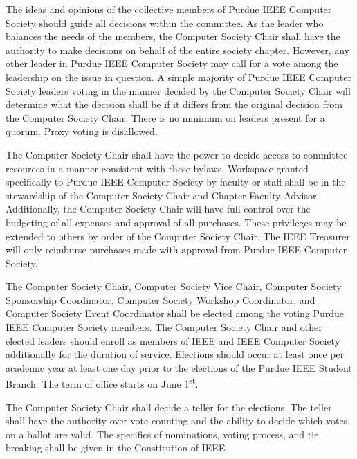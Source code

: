 \documentclass[12pt]{constitution}
\newcommand{\datetermstart}{June 1\textsuperscript{st}} %
\begin{document}
\label{art:decide}

The ideas and opinions of the collective members of Purdue IEEE Computer Society should guide all decisions within the committee. As the leader who balances the needs of the members, the Computer Society Chair shall have the authority to make decisions on behalf of the entire society chapter. However, any other leader in Purdue IEEE Computer Society may call for a vote among the leadership on the issue in question. A simple majority of Purdue IEEE Computer Society leaders voting in the manner decided by the Computer Society Chair will determine what the decision shall be if it differs from the original decision from the Computer Society Chair. There is no minimum on leaders present for a quorum. Proxy voting is disallowed.

The Computer Society Chair shall have the power to decide access to committee resources in a manner consistent with these bylaws. Workspace granted specifically to Purdue IEEE Computer Society by faculty or staff shall be in the stewardship of the Computer Society Chair and Chapter Faculty Advisor. Additionally, the Computer Society Chair will have full control over the budgeting of all expenses and approval of all purchases. These privileges may be extended to others by order of the Computer Society Chair. The IEEE Treasurer will only reimburse purchases made with approval from Purdue IEEE Computer Society.


\label{art:electdepart}

The Computer Society Chair, Computer Society Vice Chair, Computer Society Sponsorship Coordinator, Computer Society Workshop Coordinator, and Computer Society Event Coordinator shall be elected among the voting Purdue IEEE Computer Society members. The Computer Society Chair and other elected leaders should enroll as members of IEEE and IEEE Computer Society additionally for the duration of service. Elections should occur at least once per academic year at least one day prior to the elections of the Purdue IEEE Student Branch. The term of office starts on \datetermstart{}.

The Computer Society Chair shall decide a teller for the elections. The teller shall have the authority over vote counting and the ability to decide which votes on a ballot are valid. The specifics of nominations, voting process, and tie breaking shall be given in the Constitution of IEEE.
\end{document}
